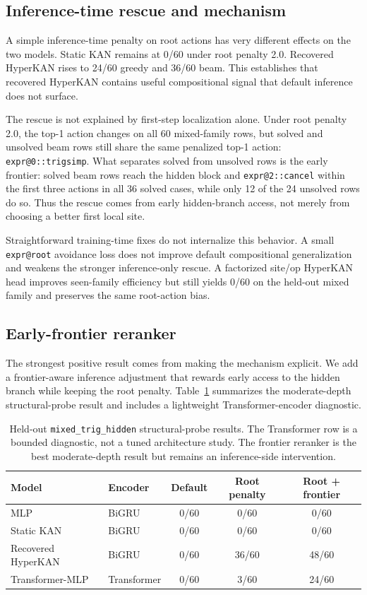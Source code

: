 \documentclass[11pt]{article}
\newcommand{\hyperkan}{HyperKAN}
\newcommand{\staticKAN}{Static KAN}
\newcommand{\mlp}{MLP}
\begin{document}
\subsection{Inference-time rescue and mechanism}

A simple inference-time penalty on root actions has very different effects on the two models. \staticKAN{} remains at 0/60 under root penalty 2.0. Recovered \hyperkan{} rises to 24/60 greedy and 36/60 beam. This establishes that recovered \hyperkan{} contains useful compositional signal that default inference does not surface.

The rescue is not explained by first-step localization alone. Under root penalty 2.0, the top-1 action changes on all 60 mixed-family rows, but solved and unsolved beam rows still share the same penalized top-1 action: \texttt{expr@0::trigsimp}. What separates solved from unsolved rows is the early frontier: solved beam rows reach the hidden block and \texttt{expr@2::cancel} within the first three actions in all 36 solved cases, while only 12 of the 24 unsolved rows do so. Thus the rescue comes from early hidden-branch access, not merely from choosing a better first local site.

Straightforward training-time fixes do not internalize this behavior. A small \texttt{expr@root} avoidance loss does not improve default compositional generalization and weakens the stronger inference-only rescue. A factorized site/op \hyperkan{} head improves seen-family efficiency but still yields 0/60 on the held-out mixed family and preserves the same root-action bias.

\subsection{Early-frontier reranker}

The strongest positive result comes from making the mechanism explicit. We add a frontier-aware inference adjustment that rewards early access to the hidden branch while keeping the root penalty. Table~\ref{tab:structural-rescue} summarizes the moderate-depth structural-probe result and includes a lightweight Transformer-encoder diagnostic.

\begin{table}[t]
\centering
\caption{Held-out \texttt{mixed\_trig\_hidden} structural-probe results. The Transformer row is a bounded diagnostic, not a tuned architecture study. The frontier reranker is the best moderate-depth result but remains an inference-side intervention.}
\label{tab:structural-rescue}
\small
\begin{tabular}{llccc}
\toprule
Model & Encoder & Default & Root penalty & Root + frontier \\
\midrule
\mlp{} & BiGRU & 0/60 & 0/60 & 0/60 \\
\staticKAN{} & BiGRU & 0/60 & 0/60 & 0/60 \\
Recovered \hyperkan{} & BiGRU & 0/60 & 36/60 & 48/60 \\
Transformer-\mlp{} & Transformer & 0/60 & 3/60 & 24/60 \\
\bottomrule
\end{tabular}
\normalsize
\end{table}
\end{document}
